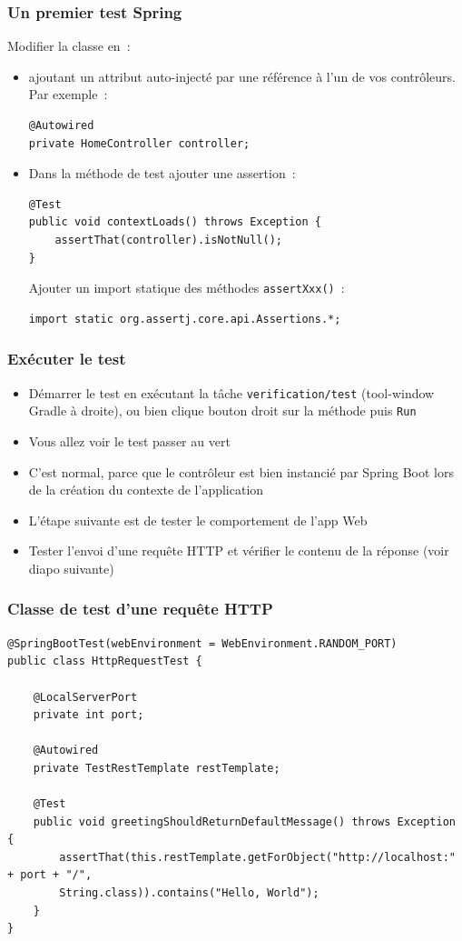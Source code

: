 \documentclass{beamer}
\begin{document}
\begin{frame}[fragile]
	\frametitle{Un premier test Spring}
	Modifier la classe en~:
	\begin{itemize}
		\item ajoutant un attribut auto-injecté par une référence à l'un de vos contrôleurs. Par exemple~:
\begin{lstlisting}
@Autowired
private HomeController controller;
\end{lstlisting}
		\item Dans la méthode de test ajouter une assertion~:
\begin{lstlisting}
@Test
public void contextLoads() throws Exception {
	assertThat(controller).isNotNull();
}
\end{lstlisting}
Ajouter un import statique des méthodes \texttt{assertXxx()}~:
\begin{lstlisting}
import static org.assertj.core.api.Assertions.*;
\end{lstlisting}
	\end{itemize}
\end{frame}

\begin{frame}[fragile]
	\frametitle{Exécuter le test}
	\begin{itemize}
		\item Démarrer le test en exécutant la tâche \texttt{verification/test} (tool-window Gradle à droite), ou bien clique bouton droit sur la méthode puis \texttt{Run}
		\item Vous allez voir le test passer au vert
		\item C'est normal, parce que le contrôleur est bien instancié par Spring Boot lors de la création du contexte de l'application
		\item L'étape suivante est de tester le comportement de l'app Web
		\item Tester l'envoi d'une requête HTTP et vérifier le contenu de la réponse (voir diapo suivante)
	\end{itemize}
\end{frame}

\begin{frame}[fragile]
	\frametitle{Classe de test d'une requête HTTP}
\begin{lstlisting}
@SpringBootTest(webEnvironment = WebEnvironment.RANDOM_PORT)
public class HttpRequestTest {
	
	@LocalServerPort
	private int port;
	
	@Autowired
	private TestRestTemplate restTemplate;
	
	@Test
	public void greetingShouldReturnDefaultMessage() throws Exception {
		assertThat(this.restTemplate.getForObject("http://localhost:" + port + "/",
		String.class)).contains("Hello, World");
	}
}
\end{lstlisting}
\end{frame}
\end{document}
